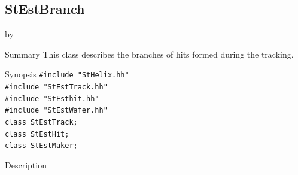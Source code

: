 \documentclass[twoside]{article}
\newcommand{\entrylabel}[1]{\mbox{\textbf{{#1}}}\hfil}%
\newenvironment{entry}
{\begin{list}{}%
    {\renewcommand{\makelabel}{\entrylabel}%
     \setlength{\labelwidth}{90pt}%
     \setlength{\leftmargin}{\labelwidth}
     \advance\leftmargin by \labelsep%
      }%
    }%
  {\end{list}}
\newcommand{\Entrylabel}[1]%
{\raisebox{0pt}[1ex][0pt]{\makebox[\labelwidth][l]%
    {\parbox[t]{\labelwidth}{\hspace{0pt}\textbf{{#1}}}}}}
\newenvironment{Entry}%
{\renewcommand{\entrylabel}{\Entrylabel}\begin{entry}}%
  {\end{entry}}
\begin{document}
\subsection{StEstBranch}
\label{sec:StestBranchq}
\begin{Entry}
\item[Summary]
This class describes the branches of hits formed during the tracking.
\item[Synopsis]
    \verb+#include "StHelix.hh"+\\
    \verb+#include "StEstTrack.hh"+\\
    \verb+#include "StEsthit.hh"+\\
    \verb+#include "StEstWafer.hh"+\\

    \verb+class StEstTrack;+\\
    \verb+class StEstHit;+\\
    \verb+class StEstMaker;+\\
\item[Description]


\end{Entry}
\end{document}
